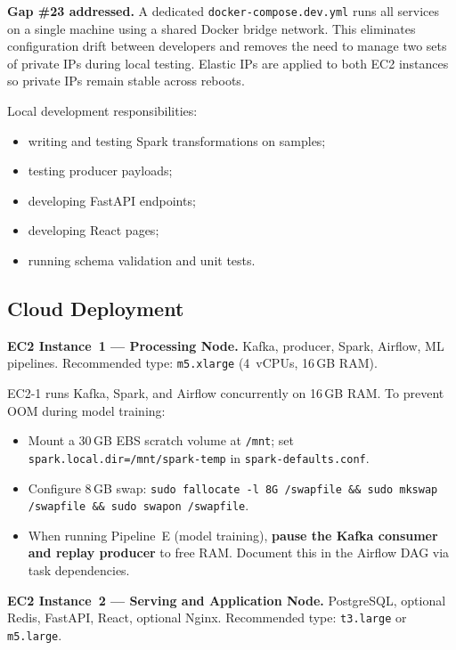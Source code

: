 \documentclass[11pt,a4paper]{article}
\begin{document}
\begin{notebox}
\textbf{Gap \#23 addressed.} A dedicated \texttt{docker-compose.dev.yml} runs all services on a
single machine using a shared Docker bridge network. This eliminates configuration drift between
developers and removes the need to manage two sets of private IPs during local testing. Elastic
IPs are applied to both EC2 instances so private IPs remain stable across reboots.
\end{notebox}

Local development responsibilities:
\begin{itemize}[nosep]
  \item writing and testing Spark transformations on samples;
  \item testing producer payloads;
  \item developing FastAPI endpoints;
  \item developing React pages;
  \item running schema validation and unit tests.
\end{itemize}

\subsection{Cloud Deployment}

\textbf{EC2 Instance~1 --- Processing Node.}
Kafka, producer, Spark, Airflow, ML pipelines.
Recommended type: \texttt{m5.xlarge} (4~vCPUs, 16\,GB RAM).

\begin{criticalbox}
EC2-1 runs Kafka, Spark, and Airflow concurrently on 16\,GB RAM. To prevent OOM during model
training:
\begin{itemize}[nosep]
  \item Mount a 30\,GB EBS scratch volume at \texttt{/mnt}; set
    \texttt{spark.local.dir=/mnt/spark-temp} in \texttt{spark-defaults.conf}.
  \item Configure 8\,GB swap: \texttt{sudo fallocate -l 8G /swapfile \&\& sudo mkswap
    /swapfile \&\& sudo swapon /swapfile}.
  \item When running Pipeline~E (model training), \textbf{pause the Kafka consumer and replay
    producer} to free RAM. Document this in the Airflow DAG via task dependencies.
\end{itemize}
\end{criticalbox}

\textbf{EC2 Instance~2 --- Serving and Application Node.}
PostgreSQL, optional Redis, FastAPI, React, optional Nginx.
Recommended type: \texttt{t3.large} or \texttt{m5.large}.
\end{document}
